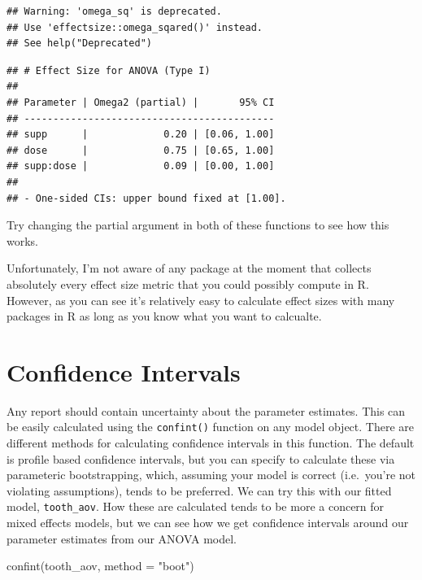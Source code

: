 \documentclass[
]{book}
\newenvironment{Shaded}{\begin{snugshade}}{\end{snugshade}}
\newcommand{\AttributeTok}[1]{\textcolor[rgb]{0.77,0.63,0.00}{#1}}
\newcommand{\FunctionTok}[1]{\textcolor[rgb]{0.00,0.00,0.00}{#1}}
\newcommand{\NormalTok}[1]{#1}
\newcommand{\StringTok}[1]{\textcolor[rgb]{0.31,0.60,0.02}{#1}}
\begin{document}
\begin{verbatim}
## Warning: 'omega_sq' is deprecated.
## Use 'effectsize::omega_sqared()' instead.
## See help("Deprecated")
\end{verbatim}

\begin{verbatim}
## # Effect Size for ANOVA (Type I)
## 
## Parameter | Omega2 (partial) |       95% CI
## -------------------------------------------
## supp      |             0.20 | [0.06, 1.00]
## dose      |             0.75 | [0.65, 1.00]
## supp:dose |             0.09 | [0.00, 1.00]
## 
## - One-sided CIs: upper bound fixed at [1.00].
\end{verbatim}

Try changing the partial argument in both of these functions to see how this works.

Unfortunately, I'm not aware of any package at the moment that collects absolutely every effect size metric that you could possibly compute in R. However, as you can see it's relatively easy to calculate effect sizes with many packages in R as long as you know what you want to calcualte.

\hypertarget{confidence-intervals}{%
\section{Confidence Intervals}\label{confidence-intervals}}

Any report should contain uncertainty about the parameter estimates. This can be easily calculated using the \texttt{confint()} function on any model object. There are different methods for calculating confidence intervals in this function. The default is profile based confidence intervals, but you can specify to calculate these via parameteric bootstrapping, which, assuming your model is correct (i.e.~you're not violating assumptions), tends to be preferred. We can try this with our fitted model, \texttt{tooth\_aov}. How these are calculated tends to be more a concern for mixed effects models, but we can see how we get confidence intervals around our parameter estimates from our ANOVA model.

\begin{Shaded}
\begin{Highlighting}[]
\FunctionTok{confint}\NormalTok{(tooth\_aov, }\AttributeTok{method =} \StringTok{"boot"}\NormalTok{)}
\end{Highlighting}
\end{Shaded}
\end{document}
